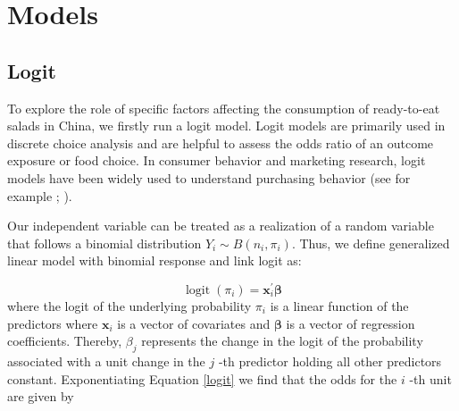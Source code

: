 \documentclass[a4,12pt]{article}
\begin{document}



\section{Models }
\label{sec:2}


\subsection{Logit}
To explore the role of specific factors affecting the consumption of ready-to-eat salads in China, we firstly run a logit model. Logit models are primarily used in discrete choice analysis and are helpful to assess the odds ratio of an outcome exposure or food choice. In consumer behavior and marketing research, logit models have been widely used to understand purchasing behavior (see for example \cite{Nevo11}; \cite{Roberts93}). 

Our independent variable can be treated as a realization of a random variable that follows a binomial distribution $Y_{i} \sim B\left(n_{i}, \pi_{i}\right)$.
Thus, we define generalized linear model with binomial response and link logit as:

\begin{equation}
\operatorname{logit}\left(\pi_{i}\right)=\mathbf{x}_{i}^{\prime} \boldsymbol{\beta}
\label{logit}
\end{equation}
where the logit of the underlying probability $\pi_{i}$ is a linear function of the predictors where $\mathbf{x}_{i}$ is a vector of covariates and $\boldsymbol{\beta}$ is a vector of regression coefficients. 
Thereby, $\beta_{j}$ represents the change in the logit of the probability associated with a unit change in the $j$ -th predictor holding all other predictors constant.
Exponentiating Equation \ref{logit} we find that the odds for the $i$ -th unit are given by 
\end{document}
